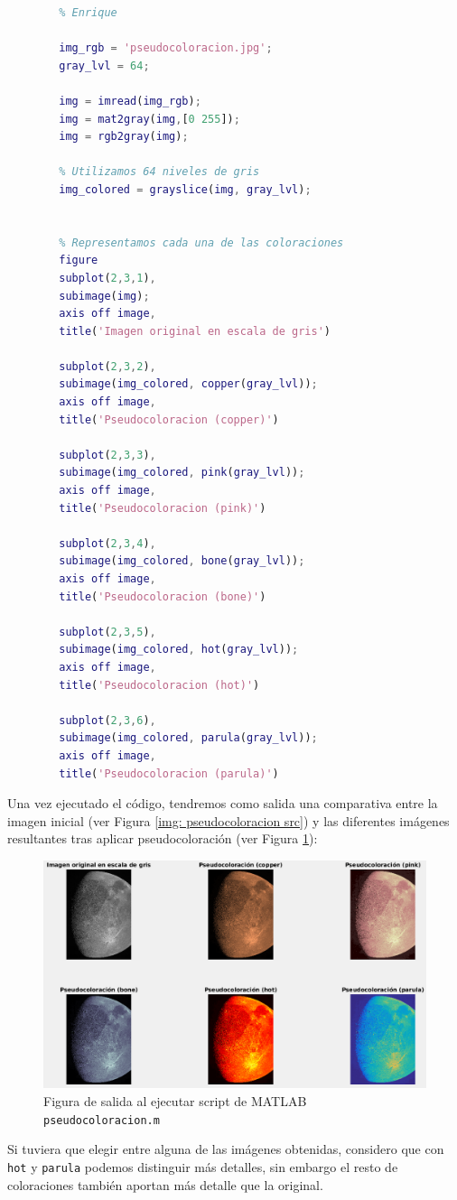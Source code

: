 \documentclass[12pt]{article}
\begin{document}
	\begin{lstlisting}[language=Matlab, caption={Implementación de pseucoloración en \texttt{MATLAB}}]
		% 8 - Pseudocoloracion por nivel de gris
		% Enrique 
		
		img_rgb = 'pseudocoloracion.jpg';
		gray_lvl = 64;
		
		img = imread(img_rgb);
		img = mat2gray(img,[0 255]);
		img = rgb2gray(img);
		
		% Utilizamos 64 niveles de gris
		img_colored = grayslice(img, gray_lvl);
		
		
		% Representamos cada una de las coloraciones
		figure
		subplot(2,3,1),
		subimage(img);
		axis off image,
		title('Imagen original en escala de gris')
		
		subplot(2,3,2),
		subimage(img_colored, copper(gray_lvl));
		axis off image,
		title('Pseudocoloracion (copper)')
		
		subplot(2,3,3),
		subimage(img_colored, pink(gray_lvl));
		axis off image,
		title('Pseudocoloracion (pink)')
		
		subplot(2,3,4),
		subimage(img_colored, bone(gray_lvl));
		axis off image,
		title('Pseudocoloracion (bone)')
		
		subplot(2,3,5),
		subimage(img_colored, hot(gray_lvl));
		axis off image,
		title('Pseudocoloracion (hot)')
		
		subplot(2,3,6),
		subimage(img_colored, parula(gray_lvl));
		axis off image,
		title('Pseudocoloracion (parula)')
	\end{lstlisting}
	
	\pagebreak
	
	\noindent Una vez ejecutado el código, tendremos como salida una comparativa entre la imagen inicial (ver Figura \ref{img: pseudocoloracion src}) y las diferentes imágenes resultantes tras aplicar pseudocoloración (ver Figura \ref{img: pseudocoloracion output}):
	
	\begin{figure}[h]
		\begin{center}
			\includegraphics[width=1\textwidth]{img/pseudocoloracion_output.png}
			\caption{Figura de salida al ejecutar script de MATLAB \texttt{pseudocoloracion.m}}
			\label{img: pseudocoloracion output}
		\end{center}
	\end{figure}

	\noindent Si tuviera que elegir entre alguna de las imágenes obtenidas, considero que con \texttt{hot} y \texttt{parula} podemos distinguir más detalles, sin embargo el resto de coloraciones también aportan más detalle que la original.
	
	\pagebreak
\end{document}
